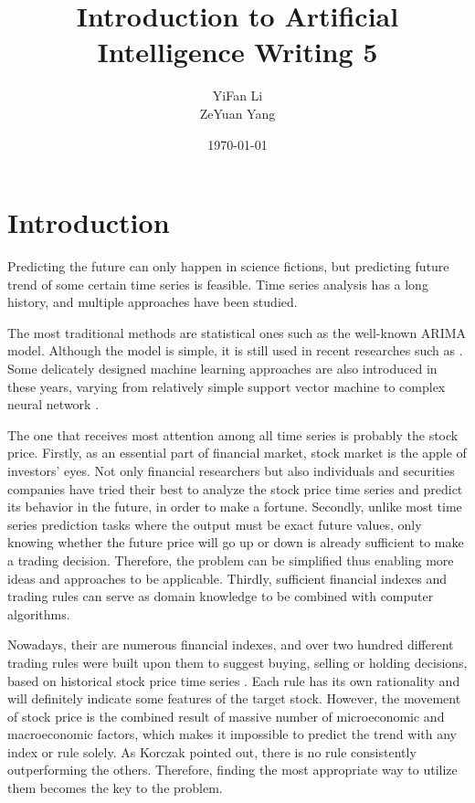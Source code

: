 \documentclass{article}
\title{Introduction to Artificial Intelligence Writing 5}
\author{YiFan Li\\ZeYuan Yang}
\date{\today}
\begin{document}
\maketitle
{}



\section{Introduction}

Predicting the future can only happen in science fictions,
but predicting future trend of some certain time series is feasible.
Time series analysis has a long history, and multiple approaches have been studied.

The most traditional methods are statistical ones such as the well-known ARIMA model.
Although the model is simple, it is still used in recent researches such as \cite{arima-bus-travel}.
Some delicately designed machine learning approaches are also introduced in these years,
varying from relatively simple support vector machine \cite{support-vector-machine}
to complex neural network \cite{time-series-prediction-and-neural-networks}.

The one that receives most attention among all time series is probably the stock price.
Firstly, as an essential part of financial market, stock market is the apple of investors' eyes.
Not only financial researchers but also individuals and securities companies have
tried their best to analyze the stock price time series and predict its behavior in the future,
in order to make a fortune.
Secondly, unlike most time series prediction tasks where the output must be exact future values,
only knowing whether the future price will go up or down is already sufficient to make a trading decision.
Therefore, the problem can be simplified thus enabling more ideas and approaches to be applicable.
Thirdly, sufficient financial indexes and trading rules
can serve as domain knowledge to be combined with computer algorithms.

Nowadays, their are numerous financial indexes, and over two hundred different trading rules were
built upon them to suggest buying, selling or holding decisions,
based on historical stock price time series \cite{stock-timing-using-genetic-algorithms}.
Each rule has its own rationality and will definitely indicate some features of the target stock.
However, the movement of stock price is the combined result of massive number of microeconomic and macroeconomic factors,
which makes it impossible to predict the trend with any index or rule solely.
As Korczak \cite{stock-timing-using-genetic-algorithms} pointed out,
there is no rule consistently outperforming the others.
Therefore, finding the most appropriate way to utilize them becomes the key to the problem.
\end{document}
